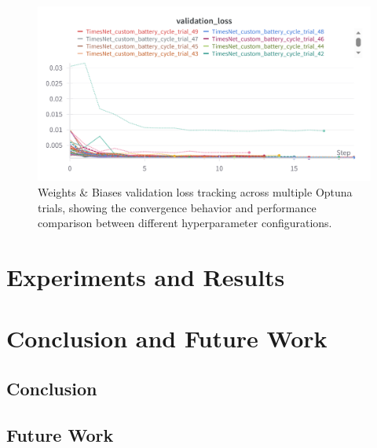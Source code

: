 \begin{figure}[htbp]
    \centering
    \includegraphics[width=1.0\textwidth]{imgs/W&B_optimization_validation_loss.png}
    \caption{Weights \& Biases validation loss tracking across multiple Optuna trials, showing the convergence behavior and performance comparison between different hyperparameter configurations.}
    \label{fig:wandb_validation_loss}
\end{figure}

\chapter{Experiments and Results}
\label{sec:experiments_results}

\lipsum[2-4]

\chapter{Conclusion and Future Work}
\label{sec:conclusion_future_work}
\lipsum[1]
\section{Conclusion}
\lipsum[5-6]
\section{Future Work}
\lipsum[7-8]



